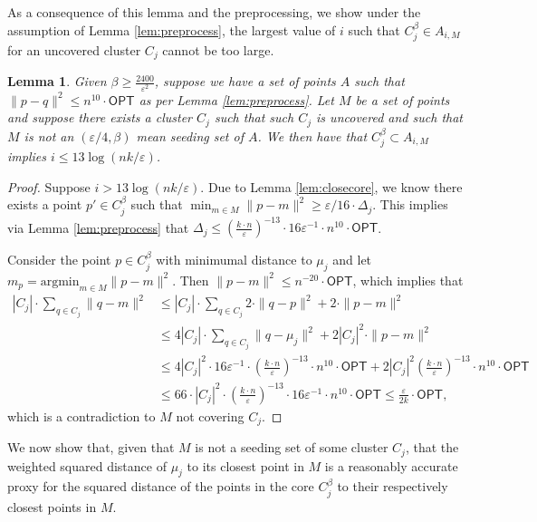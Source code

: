 \documentclass[10pt,a4paper]{amsart}
\newtheorem{lemma}[theorem]{Lemma}
\def \OPT    {\mdef{\mathsf{OPT}}}
\newcommand{\mdef}[1]{{\ensuremath{#1}}\xspace}  %
\begin{document}
As a consequence of this lemma and the preprocessing, we show under the assumption of Lemma \ref{lem:preprocess}, the largest value of $i$ such that $C_j^\beta \in A_{i,M}$ for an uncovered cluster $C_j$ cannot be too large.
\begin{lemma}
\label{lem:preprocess2}
    Given $\beta \geq \frac{2400}{\varepsilon^{2}}$,
    suppose we have a set of points $A$ such that $\|p-q\|^2 \leq n^{10}\cdot \OPT$ as per Lemma \ref{lem:preprocess}. 
    Let $M$ be a set of points and suppose there exists a cluster $C_j$ such that such $C_j$ is uncovered and such that $M$ is not an $(\varepsilon/4,\beta)$ mean seeding set of $A$. We then have that $C_j^\beta \subset A_{i,M}$ implies $i\leq 13 \log(nk/\varepsilon)$.
\end{lemma}
\begin{proof}
    Suppose $i> 13 \log(nk/\varepsilon)$. 
    Due to Lemma \ref{lem:closecore}, we know there exists a point $p'\in C_j^\beta$ such that $\min_{m\in M} \|p-m\|^2 \geq \varepsilon/16\cdot \Delta_j$. This implies via Lemma \ref{lem:preprocess} that $\Delta_j \leq \left(\frac{k \cdot n}{\varepsilon}\right)^{-13}\cdot 16\varepsilon^{-1}\cdot n^{10}\cdot\OPT$.
    
    Consider the point $p\in C_j^\beta$ with minimumal distance to $\mu_j$ and let $m_p=\text{argmin}_{m\in M} \|p-m\|^2$. Then $\|p-m\|^2 \leq n^{-20}\cdot \OPT$, which implies that 
    \begin{align*}
        |C_j|\cdot \sum_{q\in C_j}\|q-m\|^2 &\leq |C_j|\cdot\sum_{q\in C_j}2\cdot\|q-p\|^2+2\cdot\|p-m\|^2 \\
        & \leq  4|C_j|\cdot \sum_{q\in C_j}\|q-\mu_j\|^2+2 |C_j|^2\cdot\|p-m\|^2 \\
        &\leq 4|C_j|^2\cdot 16 \varepsilon^{-1}\cdot \left(\frac{k \cdot n}{\varepsilon}\right)^{-13}\cdot n^{10}\cdot\OPT + 2 |C_j|^2 \left(\frac{k \cdot n}{\varepsilon}\right)^{-13}\cdot  n^{10}\cdot\OPT \\
        &\leq 66\cdot |C_j|^2\cdot\left(\frac{k \cdot n}{\varepsilon}\right)^{-13}\cdot 16\varepsilon^{-1}\cdot n^{10}\cdot\OPT \leq \frac{\varepsilon}{2k}\cdot\OPT,
    \end{align*}
     which is a contradiction to $M$ not covering $C_j$.
\end{proof}

We now show that, given that $M$ is not a seeding set of some cluster $C_j$, that the weighted squared distance of $\mu_j$ to its closest point in $M$ is a reasonably accurate proxy for the squared distance of the points in the core $C_j^\beta$ to their respectively closest points in $M$.
\end{document}
